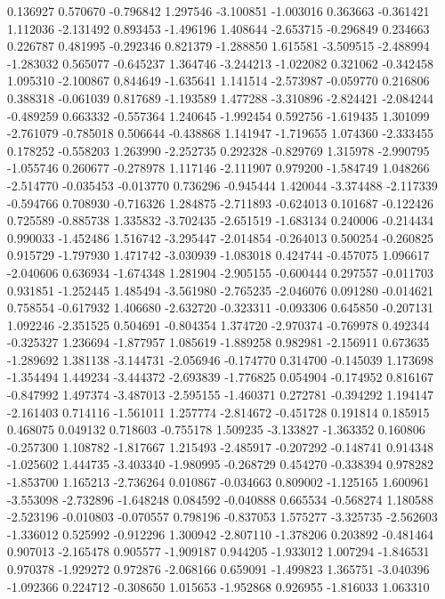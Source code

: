 0.136927
0.570670
-0.796842
1.297546
-3.100851
-1.003016
0.363663
-0.361421
1.112036
-2.131492
0.893453
-1.496196
1.408644
-2.653715
-0.296849
0.234663
0.226787
0.481995
-0.292346
0.821379
-1.288850
1.615581
-3.509515
-2.488994
-1.283032
0.565077
-0.645237
1.364746
-3.244213
-1.022082
0.321062
-0.342458
1.095310
-2.100867
0.844649
-1.635641
1.141514
-2.573987
-0.059770
0.216806
0.388318
-0.061039
0.817689
-1.193589
1.477288
-3.310896
-2.824421
-2.084244
-0.489259
0.663332
-0.557364
1.240645
-1.992454
0.592756
-1.619435
1.301099
-2.761079
-0.785018
0.506644
-0.438868
1.141947
-1.719655
1.074360
-2.333455
0.178252
-0.558203
1.263990
-2.252735
0.292328
-0.829769
1.315978
-2.990795
-1.055746
0.260677
-0.278978
1.117146
-2.111907
0.979200
-1.584749
1.048266
-2.514770
-0.035453
-0.013770
0.736296
-0.945444
1.420044
-3.374488
-2.117339
-0.594766
0.708930
-0.716326
1.284875
-2.711893
-0.624013
0.101687
-0.122426
0.725589
-0.885738
1.335832
-3.702435
-2.651519
-1.683134
0.240006
-0.214434
0.990033
-1.452486
1.516742
-3.295447
-2.014854
-0.264013
0.500254
-0.260825
0.915729
-1.797930
1.471742
-3.030939
-1.083018
0.424744
-0.457075
1.096617
-2.040606
0.636934
-1.674348
1.281904
-2.905155
-0.600444
0.297557
-0.011703
0.931851
-1.252445
1.485494
-3.561980
-2.765235
-2.046076
0.091280
-0.014621
0.758554
-0.617932
1.406680
-2.632720
-0.323311
-0.093306
0.645850
-0.207131
1.092246
-2.351525
0.504691
-0.804354
1.374720
-2.970374
-0.769978
0.492344
-0.325327
1.236694
-1.877957
1.085619
-1.889258
0.982981
-2.156911
0.673635
-1.289692
1.381138
-3.144731
-2.056946
-0.174770
0.314700
-0.145039
1.173698
-1.354494
1.449234
-3.444372
-2.693839
-1.776825
0.054904
-0.174952
0.816167
-0.847992
1.497374
-3.487013
-2.595155
-1.460371
0.272781
-0.394292
1.194147
-2.161403
0.714116
-1.561011
1.257774
-2.814672
-0.451728
0.191814
0.185915
0.468075
0.049132
0.718603
-0.755178
1.509235
-3.133827
-1.363352
0.160806
-0.257300
1.108782
-1.817667
1.215493
-2.485917
-0.207292
-0.148741
0.914348
-1.025602
1.444735
-3.403340
-1.980995
-0.268729
0.454270
-0.338394
0.978282
-1.853700
1.165213
-2.736264
0.010867
-0.034663
0.809002
-1.125165
1.600961
-3.553098
-2.732896
-1.648248
0.084592
-0.040888
0.665534
-0.568274
1.180588
-2.523196
-0.010803
-0.070557
0.798196
-0.837053
1.575277
-3.325735
-2.562603
-1.336012
0.525992
-0.912296
1.300942
-2.807110
-1.378206
0.203892
-0.481464
0.907013
-2.165478
0.905577
-1.909187
0.944205
-1.933012
1.007294
-1.846531
0.970378
-1.929272
0.972876
-2.068166
0.659091
-1.499823
1.365751
-3.040396
-1.092366
0.224712
-0.308650
1.015653
-1.952868
0.926955
-1.816033
1.063310
